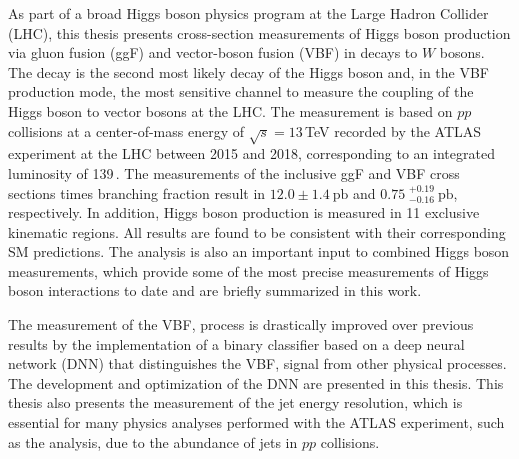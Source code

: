 
As part of a broad Higgs boson physics program at the Large Hadron Collider (LHC), this thesis presents cross-section measurements of Higgs boson production via gluon fusion (ggF) and vector-boson fusion (VBF) in decays to $W$ bosons.
The \HWW decay is the second most likely decay of the Higgs boson and, in the VBF production mode, the most sensitive channel to measure the coupling of the Higgs boson to vector bosons at the LHC.
The measurement is based on $pp$ collisions at a center-of-mass energy of $\sqrt{s} = 13\,$TeV recorded by the ATLAS experiment at the LHC between 2015 and 2018, corresponding to an integrated luminosity of 139\,\ifb.
The measurements of the inclusive ggF and VBF cross sections times branching fraction result in $12.0 \pm 1.4~\mathrm{pb}$ and $0.75\;^{+0.19}_{-0.16}~\mathrm{pb}$, respectively.
In addition, Higgs boson production is measured in 11 exclusive kinematic regions. All results are found to be consistent with their corresponding SM predictions.
The \HWW analysis is also an important input to combined Higgs boson measurements, which provide some of the most precise measurements of Higgs boson interactions to date and are briefly summarized in this work.

The measurement of the VBF, \HWW process is drastically improved over previous results by the implementation of a binary classifier based on a deep neural network (DNN) that distinguishes the VBF, \HWW signal from other physical processes. 
The development and optimization of the DNN are presented in this thesis. 
This thesis also presents the measurement of the jet energy resolution, which is essential for many physics analyses performed with the ATLAS experiment, such as the \HWW analysis, due to the abundance of jets in $pp$ collisions.

